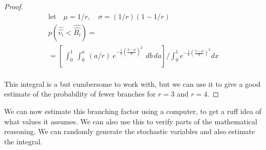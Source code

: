 \documentclass{article}
\begin{document}
\begin{proof}
\begin{gather*}
  \text{let} \quad{} \mu = 1/r, \quad{} \sigma = (1/r)(1 - 1/r) \\
  p(\hat{\hat{v_{i}}} < \hat{\hat{B_i}}) = \\
  = [\
   \int_0^1 \
    \int_0^{a} \
      (a/r)  \
      e^{-\frac{1}{2}(\frac{b - \mu}{\sigma})^2} \
   \, db\,da
    ]    /\int_0^1 e^{-\frac{1}{2}(\frac{x - \mu}{\sigma})^2} dx \\
\end{gather*}

This integral is a but cumbersome to work with, but we can use it to give a good estimate of the probability of fewer branches for $r=3$ and $r=4$.

\end{proof}

We can now estimate this branching factor using a computer, to get a ruff idea of what values it assumes. We can also use this to verify parts of the mathematical reasoning. We can randomly generate the stochastic variables and also estimate the integral.
\end{document}
